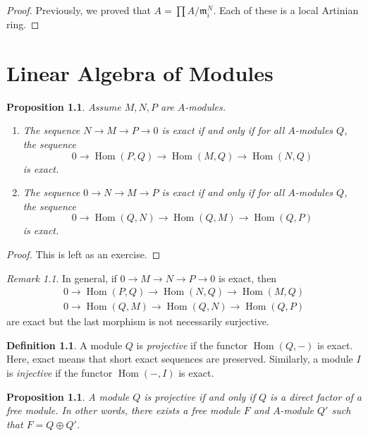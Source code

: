 \documentclass[leqno, openany]{memoir}
\newtheorem{prop}[thm]{Proposition}
\theoremstyle{definition}
\newtheorem{defn}[thm]{Definition}
\theoremstyle{remark}
\newtheorem{rmk}[thm]{Remark}
\theoremstyle{plain}
\theoremstyle{definition}
\theoremstyle{remark}
\newcommand{\mf}[1]{\mathfrak{#1}}
\DeclareMathOperator{\Hom}{Hom}
\begin{document}
\begin{proof}
    Previously, we proved that $A = \prod A / \mf{m}_i^N$. Each of these is a local Artinian ring.
\end{proof}

\chapter{Linear Algebra of Modules}%
\label{cha:linear_algebra_of_modules}

\begin{prop}
    Assume $M, N, P$ are $A$-modules.
    \begin{enumerate}
        \item The sequence $N \to M \to P \to 0$ is exact if and only if for all $A$-modules $Q$, the sequence
            \[ 0 \to \Hom(P,Q) \to \Hom(M,Q) \to \Hom(N,Q) \]
            is exact.
        \item The sequence $0 \to N \to M \to P $ is exact if and only if for all $A$-modules $Q$, the sequence
            \[ 0 \to \Hom(Q,N) \to \Hom(Q,M) \to \Hom(Q,P) \]
            is exact.
    \end{enumerate}
\end{prop}

\begin{proof}
    This is left as an exercise.
\end{proof}

\begin{rmk}
    In general, if $0 \to M \to N \to P \to 0$ is exact, then
    \begin{align*} 0 \to \Hom(P,Q) \to \Hom(N,Q) \to \Hom(M,Q) \\
    0 \to  \Hom(Q,M) \to \Hom(Q,N) \to \Hom(Q,P) \end{align*}
    are exact but the last morphism is not necessarily surjective.
\end{rmk}

\begin{defn}
    A module $Q$ is \textit{projective} if the functor $\Hom(Q,-)$ is exact. Here, exact means that short exact sequences are preserved. Similarly, a module $I$ is \textit{injective} if the functor $\Hom(-,I)$ is exact.
\end{defn}

\begin{prop}
    A module $Q$ is projective if and only if $Q$ is a direct factor of a free module. In other words, there exists a free module $F$ and $A$-module $Q'$ such that $F = Q \oplus Q'$.
\end{prop}
\end{document}
